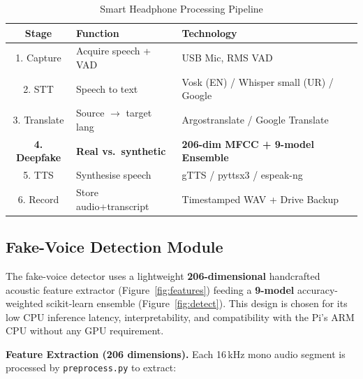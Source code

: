 \documentclass[10pt,twocolumn]{article}
\begin{document}
\begin{table}[ht]
\centering
\caption{Smart Headphone Processing Pipeline}
\label{tab:pipeline}
\small
\begin{tabularx}{\columnwidth}{|c|X|X|}
\hline
\rowcolor{sdark}\color{white}\textbf{Stage} &
\color{white}\textbf{Function} &
\color{white}\textbf{Technology} \\
\hline
1. Capture & Acquire speech + VAD & USB Mic, RMS VAD \\
\hline
2. STT & Speech to text & Vosk (EN) / Whisper small (UR) / Google \\
\hline
3. Translate & Source $\to$ target lang & Argostranslate / Google Translate \\
\hline
\rowcolor{orange!15}
\textbf{4. Deepfake} & \textbf{Real vs.\ synthetic} & \textbf{206-dim MFCC + 9-model Ensemble} \\
\hline
5. TTS & Synthesise speech & gTTS / pyttsx3 / espeak-ng \\
\hline
6. Record & Store audio+transcript & Timestamped WAV + Drive Backup \\
\hline
\end{tabularx}
\end{table}

\subsection{Fake-Voice Detection Module}
The fake-voice detector uses a lightweight \textbf{206-dimensional} handcrafted
acoustic feature extractor (Figure~\ref{fig:features}) feeding a \textbf{9-model}
accuracy-weighted scikit-learn ensemble (Figure~\ref{fig:detect}). This design is
chosen for its low CPU inference latency, interpretability, and compatibility with
the Pi's ARM CPU without any GPU requirement.

\textbf{Feature Extraction (206 dimensions).} Each 16\,kHz mono audio segment is
processed by \texttt{preprocess.py} to extract:
\end{document}
